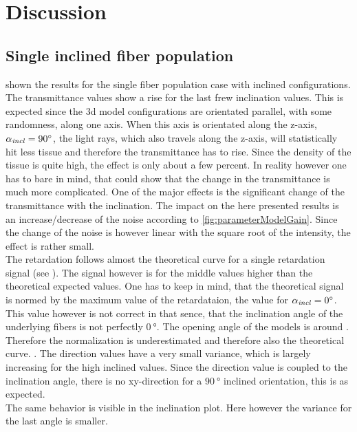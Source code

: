 \section{Discussion}
% 
\subsection{Single inclined fiber population}
 shown the results for the single fiber population case with inclined configurations.
The transmittance values show a rise for the last frew inclination values.
This is expected since the 3d model configurations are orientated parallel, with some randomness, along one axis.
When this axis is orientated along the z-axis, \ie{} $\textnormal{$\alpha_{\mathit{incl}}$}=\SI{90}{\degree}$, the light rays, which also travels along the z-axis, will statistically hit less tissue and therefore the transmittance has to rise.
Since the density of the tissue is quite high, the effect is only about a few percent.
In reality however one has to bare in mind, that \cite{Menzel2021} could show that the change in the transmittance is much more complicated.
One of the major effects is the significant change of the transmittance with the inclination.
The impact on the here presented results is an increase/decrease of the noise according to \cref{fig:parameterModelGain}.
Since the change of the noise is however linear with the square root of the intensity, the effect is rather small.
\\
% 
The retardation follows almost the theoretical curve for a single retardation signal (see ).
The signal however is for the middle values higher than the theoretical expected values.
One has to keep in mind, that the theoretical signal is normed by the maximum value of the retardataion, \ie{} the value for $\textnormal{$\alpha_{\mathit{incl}}$} = \SI{0}{\degree}$.
This value however is not correct in that sence, that the inclination angle of the underlying fibers is not perfectly $\SI{0}{\degree}$. The opening angle of the models is around \dummy{}.
Therefore the normalization is underestimated and therefore also the theoretical curve.
\dummy{}.
% 
The direction values have a very small variance, which is largely increasing for the high inclined values.
Since the direction value is coupled to the inclination angle, \ie{} there is no xy-direction for a $\SI{90}{\degree}$ inclined orientation, this is as expected.
\\
% 
The same behavior is visible in the inclination plot.
Here however the variance for the last angle is smaller.
